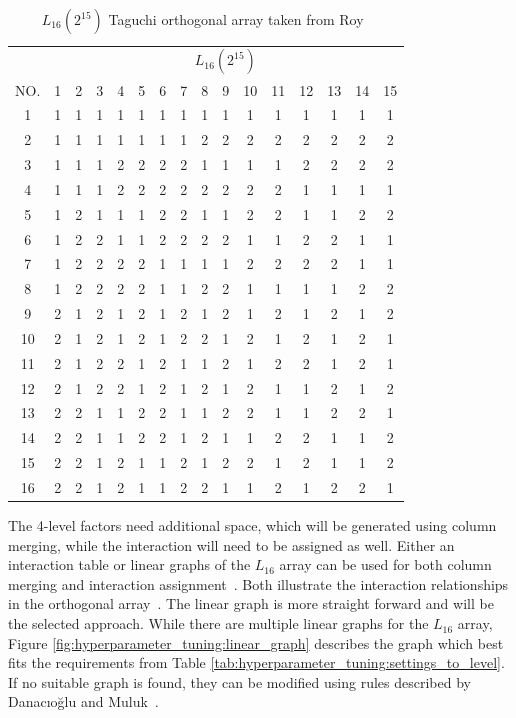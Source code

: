 \begin{table}[ht]
	\centering
	\begin{tabular}{ |c||c|c|c|c|c|c|c|c|c|c|c|c|c|c|c|  }
		\hline
		   & \multicolumn{15}{c|}{ $L_{16}(2^{15})$ } \\
		NO.& 1 & 2 & 3 & 4 & 5 & 6 & 7 & 8 & 9 & 10& 11& 12& 13& 14&15\\
		\hline
		1  & 1 & 1 & 1 & 1 & 1 & 1 & 1 & 1 & 1 & 1 & 1 & 1 & 1 & 1 & 1\\
		2  & 1 & 1 & 1 & 1 & 1 & 1 & 1 & 2 & 2 & 2 & 2 & 2 & 2 & 2 & 2\\
		3  & 1 & 1 & 1 & 2 & 2 & 2 & 2 & 1 & 1 & 1 & 1 & 2 & 2 & 2 & 2\\
		4  & 1 & 1 & 1 & 2 & 2 & 2 & 2 & 2 & 2 & 2 & 2 & 1 & 1 & 1 & 1\\
		5  & 1 & 2 & 1 & 1 & 1 & 2 & 2 & 1 & 1 & 2 & 2 & 1 & 1 & 2 & 2\\
		6  & 1 & 2 & 2 & 1 & 1 & 2 & 2 & 2 & 2 & 1 & 1 & 2 & 2 & 1 & 1\\
		7  & 1 & 2 & 2 & 2 & 2 & 1 & 1 & 1 & 1 & 2 & 2 & 2 & 2 & 1 & 1\\
		8  & 1 & 2 & 2 & 2 & 2 & 1 & 1 & 2 & 2 & 1 & 1 & 1 & 1 & 2 & 2\\
		9  & 2 & 1 & 2 & 1 & 2 & 1 & 2 & 1 & 2 & 1 & 2 & 1 & 2 & 1 & 2\\
		10 & 2 & 1 & 2 & 1 & 2 & 1 & 2 & 2 & 1 & 2 & 1 & 2 & 1 & 2 & 1\\
		11 & 2 & 1 & 2 & 2 & 1 & 2 & 1 & 1 & 2 & 1 & 2 & 2 & 1 & 2 & 1\\
		12 & 2 & 1 & 2 & 2 & 1 & 2 & 1 & 2 & 1 & 2 & 1 & 1 & 2 & 1 & 2\\
		13 & 2 & 2 & 1 & 1 & 2 & 2 & 1 & 1 & 2 & 2 & 1 & 1 & 2 & 2 & 1\\
		14 & 2 & 2 & 1 & 1 & 2 & 2 & 1 & 2 & 1 & 1 & 2 & 2 & 1 & 1 & 2\\
		15 & 2 & 2 & 1 & 2 & 1 & 1 & 2 & 1 & 2 & 2 & 1 & 2 & 1 & 1 & 2\\
		16 & 2 & 2 & 1 & 2 & 1 & 1 & 2 & 2 & 1 & 1 & 2 & 1 & 2 & 2 & 1\\
		\hline
	\end{tabular}
	\caption{ $L_{16}(2^{15})$ Taguchi orthogonal array taken from Roy~\cite{roy_primer_1990}}
	\label{tab:hyperparameter_tuning:L16_orhtogonal_array}
\end{table}

The 4-level factors need additional space, which will be generated using column merging, while the interaction will need to be assigned as well.
Either an interaction table or linear graphs of the $L_{16}$ array can be used for both column merging and interaction assignment~\cite{danacioglu_taguchi_2005}. Both illustrate the interaction relationships in the orthogonal array~\cite{yang_design_2009}.
The linear graph is more straight forward and will be the selected approach. While there are multiple linear graphs for the $L_{16}$ array, Figure \ref{fig:hyperparameter_tuning:linear_graph} describes the graph which best fits the requirements from Table \ref{tab:hyperparameter_tuning:settings_to_level}. If no suitable graph is found, they can be modified using rules described by Danacıoğlu and Muluk~\cite{danacioglu_taguchi_2005}.

